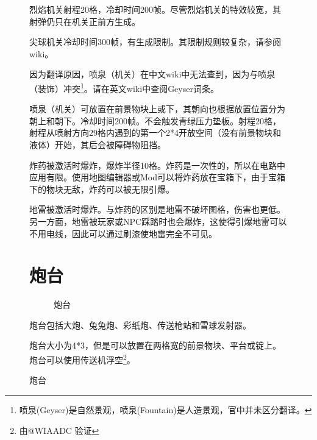 \begin{figure}[!ht]
烈焰机关射程20格，冷却时间200帧。尽管烈焰机关的特效较宽，其射弹仍只在机关正前方生成。

尖球机关冷却时间300帧，有生成限制。其限制规则较复杂，请参阅wiki。

因为翻译原因，喷泉（机关）在中文wiki中无法查到，因为与喷泉（装饰）冲突\footnote{喷泉(Geyser)是自然景观，喷泉(Fountain)是人造景观，官中并未区分翻译。}。请在英文wiki中查阅Geyser词条。

喷泉（机关）可放置在前景物块上或下，其朝向也根据放置位置分为朝上和朝下。冷却时间200帧。不会触发青绿压力垫板。射程20格，射程从喷射方向29格内遇到的第一个2*4开放空间（没有前景物块和液体）开始，其后会被障碍物阻挡。

炸药被激活时爆炸，爆炸半径10格。炸药是一次性的，所以在电路中应用有限。使用地图编辑器或Mod可以将炸药放在宝箱下，由于宝箱下的物块无敌，炸药可以被无限引爆。

地雷被激活时爆炸。与炸药的区别是地雷不破坏图格，伤害也更低。另一方面，地雷被玩家或NPC踩踏时也会爆炸，这使得引爆地雷可以不用电线，因此可以通过刷漆使地雷完全不可见。

\section{炮台}
\begin{figure}[!ht]
\centering
{}\qquad
{}\qquad
{}\qquad
{}\qquad
{}
\caption{炮台}
\end{figure}
炮台包括大炮、兔兔炮、彩纸炮、传送枪站和雪球发射器。

炮台大小为4*3，但是可以放置在两格宽的前景物块、平台或锭上。炮台可以使用传送机浮空\footnote{由@WIAADC 验证}。


\end{figure}
